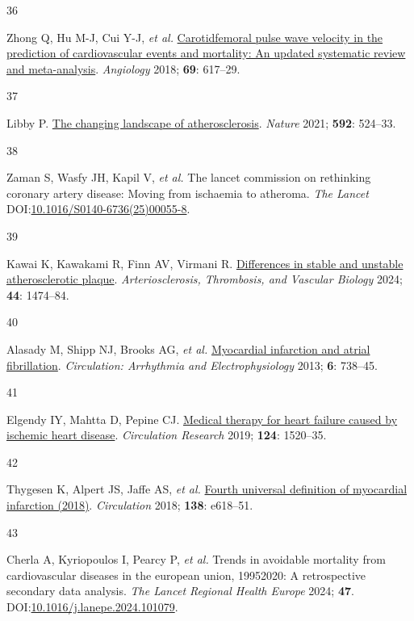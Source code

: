 \documentclass[
  a4paper,
  headsepline=true,
  open=any]{scrbook}
\newlength{\cslhangindent}
\newlength{\csllabelwidth}
\newlength{\cslentryspacingunit} %
\newenvironment{CSLReferences}[2] %
 {%
  \setlength{\parindent}{0pt}
  \ifodd #1
  \let\oldpar\par
  \def\par{\hangindent=\cslhangindent\oldpar}
  \fi
  \setlength{\parskip}{#2\cslentryspacingunit}
 }%
 {}
\newcommand{\CSLLeftMargin}[1]{\parbox[t]{\csllabelwidth}{#1}}
\newcommand{\CSLRightInline}[1]{\parbox[t]{\linewidth - \csllabelwidth}{#1}\break}
\begin{document}
\begin{CSLReferences}{0}{0}
\leavevmode{}%
\CSLLeftMargin{36 }%
\CSLRightInline{Zhong Q, Hu M-J, Cui Y-J, \emph{et al.}
\href{https://doi.org/10.1177/0003319717742544}{Carotid{\textendash}femoral
pulse wave velocity in the prediction of cardiovascular events and
mortality: An updated systematic review and meta-analysis}.
\emph{Angiology} 2018; \textbf{69}: 617--29.}

\leavevmode{}%
\CSLLeftMargin{37 }%
\CSLRightInline{Libby P.
\href{https://doi.org/10.1038/s41586-021-03392-8}{The changing landscape
of atherosclerosis}. \emph{Nature} 2021; \textbf{592}: 524--33.}

\leavevmode{}%
\CSLLeftMargin{38 }%
\CSLRightInline{Zaman S, Wasfy JH, Kapil V, \emph{et al.} The lancet
commission on rethinking coronary artery disease: Moving from ischaemia
to atheroma. \emph{The Lancet}
DOI:\href{https://doi.org/10.1016/S0140-6736(25)00055-8}{10.1016/S0140-6736(25)00055-8}.}

\leavevmode{}%
\CSLLeftMargin{39 }%
\CSLRightInline{Kawai K, Kawakami R, Finn AV, Virmani R.
\href{https://doi.org/10.1161/ATVBAHA.124.319396}{Differences in stable
and unstable atherosclerotic plaque}. \emph{Arteriosclerosis,
Thrombosis, and Vascular Biology} 2024; \textbf{44}: 1474--84.}

\leavevmode{}%
\CSLLeftMargin{40 }%
\CSLRightInline{Alasady M, Shipp NJ, Brooks AG, \emph{et al.}
\href{https://doi.org/10.1161/CIRCEP.113.000163}{Myocardial infarction
and atrial fibrillation}. \emph{Circulation: Arrhythmia and
Electrophysiology} 2013; \textbf{6}: 738--45.}

\leavevmode{}%
\CSLLeftMargin{41 }%
\CSLRightInline{Elgendy IY, Mahtta D, Pepine CJ.
\href{https://doi.org/10.1161/CIRCRESAHA.118.313568}{Medical therapy for
heart failure caused by ischemic heart disease}. \emph{Circulation
Research} 2019; \textbf{124}: 1520--35.}

\leavevmode{}%
\CSLLeftMargin{42 }%
\CSLRightInline{Thygesen K, Alpert JS, Jaffe AS, \emph{et al.}
\href{https://doi.org/10.1161/CIR.0000000000000617}{Fourth universal
definition of myocardial infarction (2018)}. \emph{Circulation} 2018;
\textbf{138}: e618--51.}

\leavevmode{}%
\CSLLeftMargin{43 }%
\CSLRightInline{Cherla A, Kyriopoulos I, Pearcy P, \emph{et al.} Trends
in avoidable mortality from cardiovascular diseases in the european
union, 1995{\textendash}2020: A retrospective secondary data analysis.
\emph{The Lancet Regional Health {\textendash} Europe} 2024;
\textbf{47}.
DOI:\href{https://doi.org/10.1016/j.lanepe.2024.101079}{10.1016/j.lanepe.2024.101079}.}


\end{CSLReferences}
\end{document}
